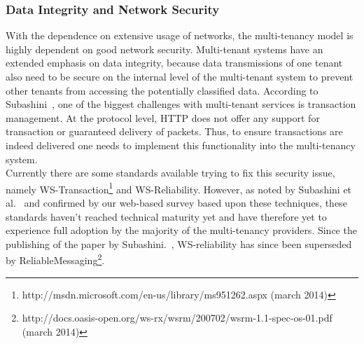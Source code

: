 \subsubsection{Data Integrity and Network Security}
With the dependence on extensive usage of networks, the multi-tenancy model is highly dependent on good network security.  
Multi-tenant systems have an extended emphasis on data integrity, because data transmissions of one tenant also need to be secure on the internal level of the multi-tenant system to prevent other tenants from accessing the potentially classified data.
According to Subashini~\cite{Subashini2011Security}, one of the biggest challenges with multi-tenant services is transaction management. 
At the protocol level, HTTP does not offer any support for transaction or guaranteed delivery of packets. 
Thus, to ensure transactions are indeed delivered one needs to implement this functionality into the multi-tenancy system.\\

Currently there are some standards available trying to fix this security issue, namely WS-Transaction\footnote{http://msdn.microsoft.com/en-us/library/ms951262.aspx (march 2014)} and WS-Reliability.
However, as noted by Subashini et al.~\cite{Subashini2011Security} and confirmed by our web-based survey based upon these techniques, these standards haven’t reached technical maturity yet and have therefore yet to experience full adoption by the majority of the multi-tenancy providers.
Since the publishing of the paper by Subashini.~\cite{Subashini2011Security}, WS-reliability has since been superseded by ReliableMessaging\footnote{http://docs.oasis-open.org/ws-rx/wsrm/200702/wsrm-1.1-spec-os-01.pdf (march 2014)}.

